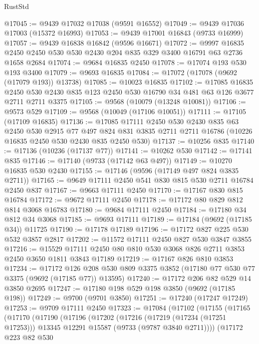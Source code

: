 \begin{lexlean}{RustStd}
\begin{coremodule}
@17045 := @9439 @17032 @17038 (@9591 @16552)
@17049 := @9439 @17036 @17003 (@15372 @16993)
@17053 := @9439 @17001 @16843 (@9733 @16999)
@17057 := @9439 @16838 @16842 (@9596 @16671)
@17072 := @9997 @16835 @2450 @2450 @530 @530 @2430 @204 @835 @329 @3400 @16791 @63 @2736 @1658 @2684
@17074 := @9684 @16835 @2450
@17078 := @17074 @193 @530 @193 @3400
@17079 := @9693 @16835
@17084 := @17072 (@17078 (@9692 (@17079 @193)) @13738)
@17085 := @10023 @16835
@17102 := @17085
    @16835
    @2450
    @530
    @2430
    @835
    @123
    @2450
    @530
    @16790
    @34
    @481
    @63
    @126
    @3677
    @2711
    @2711
    @3375
@17105 := @9568 (@10079 (@13248 @10081))
@17106 := @9573 @529
@17109 := @9568 (@10049 (@17106 @10051))
@17111 := @17105 (@17109 @16835)
@17136 := @17085
    @17111
    @2450
    @530
    @2430
    @835
    @63
    @2450
    @530
    @2915
    @77
    @497
    @824
    @831
    @3835
    @2711
    @2711
    @16786
    (@10226 @16835 @2450 @530 @2430 @835 @2450 @530)
@17137 := @10256 @835
@17140 := @17136 (@10236 (@17137 @77))
@17141 := @10262 @530
@17142 := @17141 @835
@17146 := @17140 (@9733 (@17142 @63 @497))
@17149 := @10270 @16835 @530 @2430
@17155 := @17146 (@9596 (@17149 @497 @824 @3835 @2711))
@17165 := @9649 @17111 @2450 @541 @830 @815 @530 @2711 @16784 @2450 @837
@17167 := @9663 @17111 @2450
@17170 := @17167 @830 @815 @16784
@17172 := @9672 @17111 @2450
@17178 := @17172 @80 @829 @812 @814 @3068 @16783
@17180 := @9684 @17111 @2450
@17184 := @17180 @34 @812 @34 @3068
@17185 := @9693 @17111
@17189 := @17184 (@9692 (@17185 @34)) @11725
@17190 := @17178 @17189
@17196 := @17172 @827 @225 @530 @532 @3857 @2817
@17202 := @11572 @17111 @2450 @827 @530 @3847 @3855
@17216 := @15529 @17111 @2450 @80 @810 @530 @3068 @826 @2711 @3853 @2450 @3650 @1811 @3843 @17189
@17219 := @17167 @826 @810 @3853
@17234 := @17172
    @126
    @208
    @530
    @809
    @3375
    @3852
    (@17180 @77 @530 @77 @3375 (@9692 (@17185 @77)) @13595)
@17240 := @17172 @206 @82 @529 @14 @3850 @2695
@17247 := @17180 @198 @529 @198 @3850 (@9692 (@17185 @198))
@17249 := @9700 (@9701 @3850)
@17251 := @17240 (@17247 @17249)
@17253 := @9709 @17111 @2450
@17323 := @17084
    (@17102
      (@17155
        (@17165
          (@17170
            (@17190
              (@17196
                (@17202
                  (@17216
                    (@17219 (@17234 (@17251 @17253)))
                    @13345
                    @12291
                    @15587
                    (@9733 (@9787 @3840 @2711))))
                (@17172
                  @223
                  @82
                  @530

\end{coremodule}
\end{lexlean}
